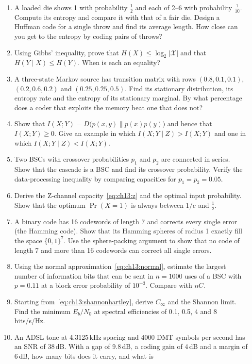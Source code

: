 \problems
\begin{enumerate}[label=\thechapter.\arabic*]
\item A loaded die shows 1 with probability $\frac12$ and each of 2--6 with probability
$\frac1{10}$. Compute its entropy and compare it with that of a fair die. Design a Huffman code for a
single throw and find its average length. How close can you get to the entropy by coding pairs of
throws?
\item Using Gibbs' inequality, prove that $H(X)\le\log_2|\mathcal{X}|$ and that $H(Y\mid X)\le H(Y)$.
When is each an equality?
\item A three-state Markov source has transition matrix with rows $(0.8,0.1,0.1)$,
$(0.2,0.6,0.2)$ and $(0.25,0.25,0.5)$. Find its stationary distribution, its entropy rate and the
entropy of its stationary marginal. By what percentage does a coder that exploits the memory beat one
that does not?
\item Show that $I(X;Y)=D\big(p(x,y)\|p(x)p(y)\big)$ and hence that $I(X;Y)\ge0$. Give an example in
which $I(X;Y\mid Z)>I(X;Y)$ and one in which $I(X;Y\mid Z)<I(X;Y)$.
\item Two BSCs with crossover probabilities $p_1$ and $p_2$ are connected in series. Show that the
cascade is a BSC and find its crossover probability. Verify the data-processing inequality by
comparing capacities for $p_1=p_2=0.05$.
\item Derive the Z-channel capacity~\eqref{eq:ch13:z} and the optimal input probability. Show that the
optimum $\Pr(X=1)$ is always between $1/e$ and $\frac12$.
\item A binary code has 16 codewords of length 7 and corrects every single error (the Hamming code).
Show that its Hamming spheres of radius 1 exactly fill the space $\{0,1\}^7$. Use the sphere-packing
argument to show that no code of length 7 and more than 16 codewords can correct all single errors.
\item Using the normal approximation~\eqref{eq:ch13:normal}, estimate the largest number of information
bits that can be sent in $n=1000$ uses of a BSC with $p=0.11$ at a block error probability of
$10^{-3}$. Compare with $nC$.
\item Starting from~\eqref{eq:ch13:shannonhartley}, derive $C_\infty$ and the Shannon limit. Find the
minimum $E_b/N_0$ at spectral efficiencies of 0.1, 0.5, 4 and 8\,bits/s/Hz.
\item An ADSL tone at 4.3125\,kHz spacing and 4000 DMT symbols per second has an SNR of 38\,dB. With a
gap of 9.8\,dB, a coding gain of 4\,dB and a margin of 6\,dB, how many bits does it carry, and what is

\end{enumerate}
